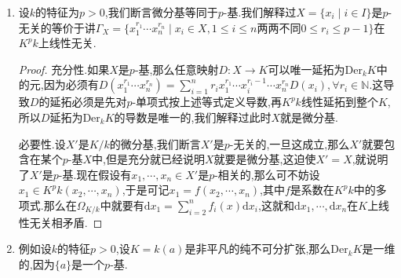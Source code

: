 \begin{enumerate}
\begin{proof}
    	Zorn引理可以说明包含一个预先取定的$p$-无关组的所有$p$-无关组中存在极大元.我们来证明极大$p$-无关组就是$p$-基.假设$X$是$K/k$的极大$p$-基,假设$K\not=K^pk(X)$,任取$t\in K-K^pk(X)$,我们只需证明$X\cup\{t\}$是$p$-无关的.假设它是$p$相关的,那么存在$K^pk(X)$中不全为零的元$g_0,g_1,\cdots,g_{p-1}$,使得$g_{p-1}t^{p-1}+\cdots+g_1t+g_0=0$,于是$t$满足$K^pk(X)$上的次数不超过$p-1$的非零多项式.另一方面按照$t^p=\alpha\in K^p$,结合$p$是素数知$T^p-\alpha$是$t$在$K^pk(X)$上的极小多项式(因为特征$p$导致$T^p-\alpha$在$K$中分解为$(T-t)^p$,倘若它在$K^pk(X)$上的极小多项式为$(T-t)^m$,那么$t^m\in K^pk(X)$,所以如果$m<p$就有$m$和$p$互素,导致$t=t^{am+bp}\in K^pk(X)$矛盾,所以$m=p$).这就和$t$还满足一个次数$\le p-1$的非零多项式相矛盾.
    \end{proof}
    \item 设$k$的特征为$p>0$,我们断言微分基等同于$p$-基.我们解释过$X=\{x_i\mid i\in I\}$是$p$-无关的等价于讲$\Gamma_X=\{x_1^{r_1}\cdots x_n^{r_n}\mid x_i\in X,1\le i\le n\text{两两不同} 0\le r_i\le p-1\}$在$K^pk$上线性无关.
    \begin{proof}
    	
    	充分性.如果$X$是$p$-基,那么任意映射$D:X\to K$可以唯一延拓为$\mathrm{Der}_kK$中的元,因为必须有$D(x_1^{r_1}\cdots x_n^{r_n})=\sum_{i=1}^nr_ix_1^{r_1}\cdots x_i^{r_i-1}\cdots x_n^{r_n}D(x_i),\forall r_i\in\mathbb{N}$.这导致$D$的延拓必须是先对$p$-单项式按上述等式定义导数,再$K^pk$线性延拓到整个$K$,所以$D$延拓为$\mathrm{Der}_kK$的导数是唯一的,我们解释过此时$X$就是微分基.
    	
    	\qquad
    	
    	必要性.设$X'$是$K/k$的微分基,我们断言$X'$是$p$-无关的,一旦这成立,那么$X'$就要包含在某个$p$-基$X$中,但是充分就已经说明$X$就要是微分基,这迫使$X'=X$,就说明了$X'$是$p$-基.现在假设有$x_1,\cdots,x_n\in X'$是$p$-相关的,那么可不妨设$x_1\in K^pk(x_2,\cdots,x_n)$,于是可记$x_1=f(x_2,\cdots,x_n)$,其中$f$是系数在$K^pk$中的多项式.那么在$\Omega_{K/k}$中就要有$\mathrm{d}x_1=\sum_{i=2}^nf_i(x)\mathrm{d}x_i$,这就和$\mathrm{d}x_1,\cdots,\mathrm{d}x_n$在$K$上线性无关相矛盾.
    \end{proof}
    \item 例如设$k$的特征$p>0$,设$K=k(a)$是非平凡的纯不可分扩张,那么$\mathrm{Der}_kK$是一维的,因为$\{a\}$是一个$p$-基.
\end{enumerate}

